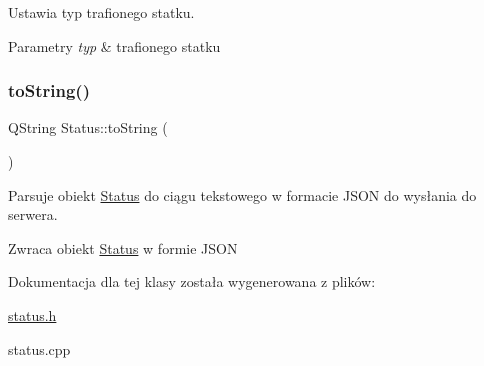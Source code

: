 Ustawia typ trafionego statku. 


\begin{DoxyParams}{Parametry}
{\em typ} & trafionego statku \\
\hline
\end{DoxyParams}
\mbox{\label{classStatus_ae86fbc75c3ebae65c26ddc4c932289e9}} 
\subsubsection{\texorpdfstring{toString()}{toString()}}
{\footnotesize\ttfamily Q\+String Status\+::to\+String (\begin{DoxyParamCaption}{ }\end{DoxyParamCaption})}



Parsuje obiekt \mbox{\hyperlink{classStatus}{Status}} do ciągu tekstowego w formacie J\+S\+ON do wysłania do serwera. 

\begin{DoxyReturn}{Zwraca}
obiekt \mbox{\hyperlink{classStatus}{Status}} w formie J\+S\+ON 
\end{DoxyReturn}


Dokumentacja dla tej klasy została wygenerowana z plików\+:\begin{DoxyCompactItemize}
\item 
\mbox{\hyperlink{status_8h}{status.\+h}}\item 
status.\+cpp\end{DoxyCompactItemize}
